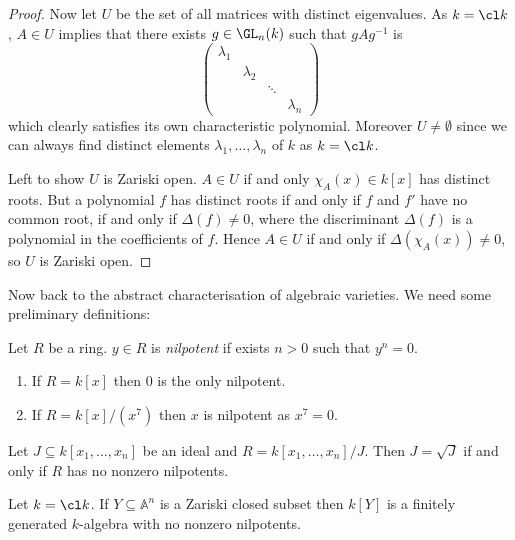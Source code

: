 \documentclass[a4paper]{article}
\renewcommand{\A}{\mathbb{A}}
\begin{document}
\begin{application}
\begin{proof}
  Now let \(U\) be the set of all matrices with distinct eigenvalues. As \(k = \cl k\), \(A \in U\) implies that there exists \(g \in \GL_n(k)\) such that \(gAg^{-1}\) is
  \[
    \begin{pmatrix}
      \lambda_1 \\
      & \lambda_2 \\
      & & \ddots \\
      & & & \lambda_n
    \end{pmatrix}
  \]
  which clearly satisfies its own characteristic polynomial. Moreover \(U \neq \emptyset\) since we can always find distinct elements \(\lambda_1, \dots, \lambda_n\) of \(k\) as \(k = \cl k\).

  Left to show \(U\) is Zariski open. \(A \in U\) if and only \(\chi_A(x) \in k[x]\) has distinct roots. But a polynomial \(f\) has distinct roots if and only if \(f\) and \(f'\) have no common root, if and only if \(\Delta(f) \neq 0\), where the discriminant \(\Delta(f)\) is a polynomial in the coefficients of \(f\). Hence \(A \in U\) if and only if \(\Delta(\chi_A(x)) \neq 0\), so \(U\) is Zariski open.
\end{proof}
\end{application}

Now back to the abstract characterisation of algebraic varieties. We need some preliminary definitions:

\begin{definition}[nilpotent]
  Let \(R\) be a ring. \(y \in R\) is \emph{nilpotent} if exists \(n > 0\) such that \(y^n = 0\).
\end{definition}

\begin{eg}\leavevmode
  \begin{enumerate}
  \item If \(R = k[x]\) then \(0\) is the only nilpotent.
  \item If \(R = k[x]/(x^7)\) then \(x\) is nilpotent as \(x^7 = 0\).
  \end{enumerate}
\end{eg}

\begin{ex}
  Let \(J \subseteq k[x_1, \dots, x_n]\) be an ideal and \(R = k[x_1, \dots, x_n]/J\). Then \(J = \sqrt J\) if and only if \(R\) has no nonzero nilpotents.
\end{ex}

\begin{corollary}
  Let \(k = \cl k\). If \(Y \subseteq \A^n\) is a Zariski closed subset then \(k[Y]\) is a finitely generated \(k\)-algebra with no nonzero nilpotents.
\end{corollary}
\end{document}
